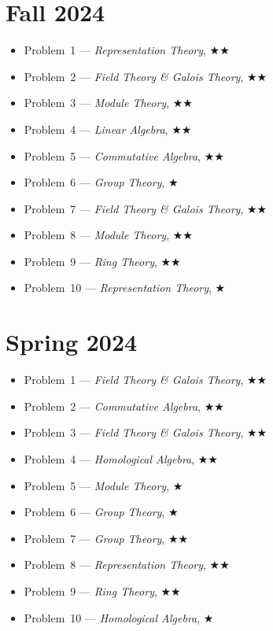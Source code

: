 \documentclass[11pt,letterpaper]{book}
\begin{document}
\section*{Fall 2024}
\begin{itemize}
\item Problem~1 --- \textit{Representation Theory}, $\bigstar\bigstar$
\item Problem~2 --- \textit{Field Theory \& Galois Theory}, $\bigstar\bigstar$
\item Problem~3 --- \textit{Module Theory}, $\bigstar\bigstar$
\item Problem~4 --- \textit{Linear Algebra}, $\bigstar\bigstar$
\item Problem~5 --- \textit{Commutative Algebra}, $\bigstar\bigstar$
\item Problem~6 --- \textit{Group Theory}, $\bigstar$
\item Problem~7 --- \textit{Field Theory \& Galois Theory}, $\bigstar\bigstar$
\item Problem~8 --- \textit{Module Theory}, $\bigstar\bigstar$
\item Problem~9 --- \textit{Ring Theory}, $\bigstar\bigstar$
\item Problem~10 --- \textit{Representation Theory}, $\bigstar$
\end{itemize}

\section*{Spring 2024}
\begin{itemize}
\item Problem~1 --- \textit{Field Theory \& Galois Theory}, $\bigstar\bigstar$
\item Problem~2 --- \textit{Commutative Algebra}, $\bigstar\bigstar$
\item Problem~3 --- \textit{Field Theory \& Galois Theory}, $\bigstar\bigstar$
\item Problem~4 --- \textit{Homological Algebra}, $\bigstar\bigstar$
\item Problem~5 --- \textit{Module Theory}, $\bigstar$
\item Problem~6 --- \textit{Group Theory}, $\bigstar$
\item Problem~7 --- \textit{Group Theory}, $\bigstar\bigstar$
\item Problem~8 --- \textit{Representation Theory}, $\bigstar\bigstar$
\item Problem~9 --- \textit{Ring Theory}, $\bigstar\bigstar$
\item Problem~10 --- \textit{Homological Algebra}, $\bigstar$
\end{itemize}
\end{document}
